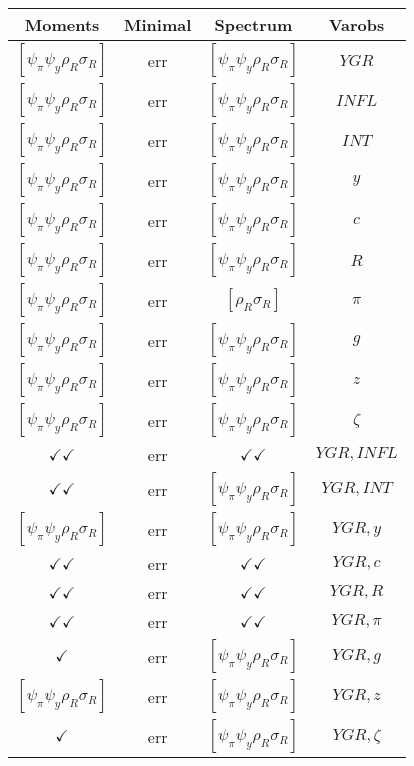 \documentclass[a4paper,10pt]{article}
\begin{document}
\centering
\begin{longtable}{|c|c|c|c|}
\hline
Moments & Minimal & Spectrum & Varobs \\
\hline
$[\psi_\pi \psi_y \rho_R \sigma_R ]$ & err & $[\psi_\pi \psi_y \rho_R \sigma_R ]$ & ${YGR}$ \\
\hline
$[\psi_\pi \psi_y \rho_R \sigma_R ]$ & err & $[\psi_\pi \psi_y \rho_R \sigma_R ]$ & ${INFL}$ \\
\hline
$[\psi_\pi \psi_y \rho_R \sigma_R ]$ & err & $[\psi_\pi \psi_y \rho_R \sigma_R ]$ & ${INT}$ \\
\hline
$[\psi_\pi \psi_y \rho_R \sigma_R ]$ & err & $[\psi_\pi \psi_y \rho_R \sigma_R ]$ & ${y}$ \\
\hline
$[\psi_\pi \psi_y \rho_R \sigma_R ]$ & err & $[\psi_\pi \psi_y \rho_R \sigma_R ]$ & ${c}$ \\
\hline
$[\psi_\pi \psi_y \rho_R \sigma_R ]$ & err & $[\psi_\pi \psi_y \rho_R \sigma_R ]$ & ${R}$ \\
\hline
$[\psi_\pi \psi_y \rho_R \sigma_R ]$ & err & $[\rho_R \sigma_R ]$ & ${\pi}$ \\
\hline
$[\psi_\pi \psi_y \rho_R \sigma_R ]$ & err & $[\psi_\pi \psi_y \rho_R \sigma_R ]$ & ${g}$ \\
\hline
$[\psi_\pi \psi_y \rho_R \sigma_R ]$ & err & $[\psi_\pi \psi_y \rho_R \sigma_R ]$ & ${z}$ \\
\hline
$[\psi_\pi \psi_y \rho_R \sigma_R ]$ & err & $[\psi_\pi \psi_y \rho_R \sigma_R ]$ & ${\zeta}$ \\
\hline
$\checkmark\checkmark$ & err & $\checkmark\checkmark$ & ${YGR},{INFL}$ \\
\hline
$\checkmark\checkmark$ & err & $[\psi_\pi \psi_y \rho_R \sigma_R ]$ & ${YGR},{INT}$ \\
\hline
$[\psi_\pi \psi_y \rho_R \sigma_R ]$ & err & $[\psi_\pi \psi_y \rho_R \sigma_R ]$ & ${YGR},{y}$ \\
\hline
$\checkmark\checkmark$ & err & $\checkmark\checkmark$ & ${YGR},{c}$ \\
\hline
$\checkmark\checkmark$ & err & $\checkmark\checkmark$ & ${YGR},{R}$ \\
\hline
$\checkmark\checkmark$ & err & $\checkmark\checkmark$ & ${YGR},{\pi}$ \\
\hline
$\checkmark$ & err & $[\psi_\pi \psi_y \rho_R \sigma_R ]$ & ${YGR},{g}$ \\
\hline
$[\psi_\pi \psi_y \rho_R \sigma_R ]$ & err & $[\psi_\pi \psi_y \rho_R \sigma_R ]$ & ${YGR},{z}$ \\
\hline
$\checkmark$ & err & $[\psi_\pi \psi_y \rho_R \sigma_R ]$ & ${YGR},{\zeta}$ \\

\end{longtable}
\end{document}

